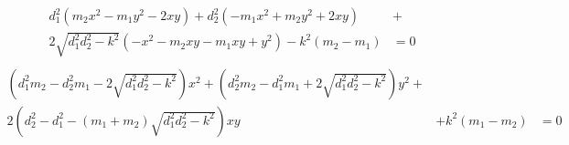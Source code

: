 \documentclass{article}
\begin{document}
\begin{align*}
    d_1^2 (m_2 x^2 - m_1 y^2 - 2 x y) + d_2^2 (- m_1 x^2 + m_2 y^2 + 2 x y) &+\\
  2 \sqrt{d_1^2 d_2^2 - k^2} (- x^2 - m_2 x y - m_1 x y + y^2) - k^2 (m_2 - m_1) &= 0\\
\end{align*}
\begin{align*}
  (d_1^2 m_2 - d_2^2 m_1 - 2 \sqrt{d_1^2 d_2^2 - k^2}) x^2 +
  (d_2^2 m_2 - d_1^2 m_1 + 2 \sqrt{d_1^2 d_2^2 - k^2}) y^2 +\\
  2 (d_2^2 - d_1^2 - (m_1 + m_2) \sqrt{d_1^2 d_2^2 - k^2}) x y &+ k^2 (m_1 - m_2) &= 0\\
\end{align*}
\end{document}
